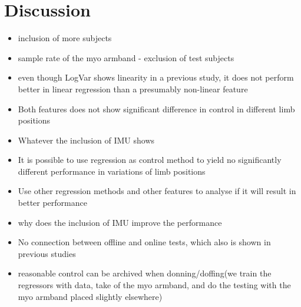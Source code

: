 \section{Discussion}

\begin{itemize}
	\item inclusion of more subjects
	\item sample rate of the myo armband - exclusion of test subjects
	\item even though LogVar shows linearity in a previous study, it does not perform better in linear regression than a presumably non-linear feature
	\item Both features does not show significant difference in control in different limb positions
	\item Whatever the inclusion of IMU shows
	\item It is possible to use regression as control method to yield no significantly different performance in variations of limb positions
	\item Use other regression methods and other features to analyse if it will result in better performance
	\item why does the inclusion of IMU improve the performance
	\item No connection between offline and online tests, which also is shown in previous studies
	\item reasonable control can be archived when donning/doffing(we train the regressors with data, take of the myo armband, and do the testing with the myo armband placed slightly elsewhere)
	
\end{itemize}